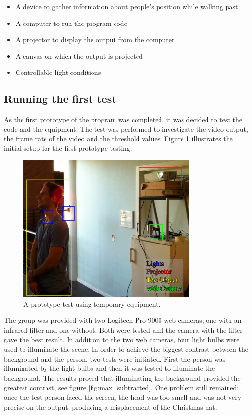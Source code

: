 
\begin{itemize}
\item A device to gather information about people's position while walking past
\item A computer to run the program code
\item A projector to display the output from the computer
\item A canvas on which the output is projected
\item Controllable light conditions
\end{itemize}

\subsection{Running the first test}
As the first prototype of the program was completed, it was decided to test the code and the  equipment. The test was performed to investigate the video output, the frame rate of the video and the threshold values. Figure \ref{fig:ir_cam_test} illustrates the initial setup for the first prototype testing.

\begin{figure}[htbp]
\centering
\includegraphics[width=0.80\textwidth]{Pictures/Test/TestSetup.jpg}
\caption{A prototype test using temporary equipment.}
\label{fig:ir_cam_test}
\end{figure} 

The group was provided with two Logitech Pro 9000 web cameras, one with an infrared filter and one without. Both were tested and the camera with the filter gave the best result. In addition to the two web cameras, four light bulbs were used to illuminate the scene. In order to achieve the biggest contrast between the background and the person, two tests were initiated. First the person was illuminated by the light bulbs and then it was tested to illuminate the background. The results proved that illuminating the background provided the greatest contrast, see figure \ref{fig:max_subtracted}. One problem still remained: once the test person faced the screen, the head was too small and was not very precise on the output, producing a misplacement of the Christmas hat.

